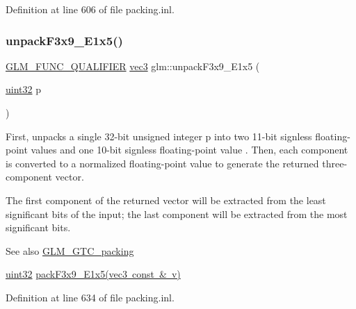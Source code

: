 Definition at line 606 of file packing.\+inl.

\mbox{\label{group__gtc__packing_ga15d8845a31e1e55d493803d0c8cb5910}} 
\subsubsection{\texorpdfstring{unpackF3x9\_E1x5()}{unpackF3x9\_E1x5()}}
{\footnotesize\ttfamily \mbox{\hyperlink{setup_8hpp_a33fdea6f91c5f834105f7415e2a64407}{G\+L\+M\+\_\+\+F\+U\+N\+C\+\_\+\+Q\+U\+A\+L\+I\+F\+I\+ER}} \mbox{\hyperlink{group__core__types_ga1c47e8b3386109bc992b6c48e91b0be7}{vec3}} glm\+::unpack\+F3x9\+\_\+\+E1x5 (\begin{DoxyParamCaption}\item[{\mbox{\hyperlink{group__gtc__type__precision_ga202b6a53c105fcb7e531f9b443518451}{uint32}}}]{p }\end{DoxyParamCaption})}

First, unpacks a single 32-\/bit unsigned integer p into two 11-\/bit signless floating-\/point values and one 10-\/bit signless floating-\/point value . Then, each component is converted to a normalized floating-\/point value to generate the returned three-\/component vector.

The first component of the returned vector will be extracted from the least significant bits of the input; the last component will be extracted from the most significant bits.

\begin{DoxySeeAlso}{See also}
\mbox{\hyperlink{group__gtc__packing}{G\+L\+M\+\_\+\+G\+T\+C\+\_\+packing}} 

\mbox{\hyperlink{group__gtc__type__precision_ga202b6a53c105fcb7e531f9b443518451}{uint32}} \mbox{\hyperlink{group__gtc__packing_ga0984f9598edc648d59a9643d9a61b121}{pack\+F3x9\+\_\+\+E1x5(vec3 const \& v)}} 
\end{DoxySeeAlso}


Definition at line 634 of file packing.\+inl.

\mbox{\label{group__gtc__packing_gaf3f9387834f8d8beadfe723c1dd247a7}} 
